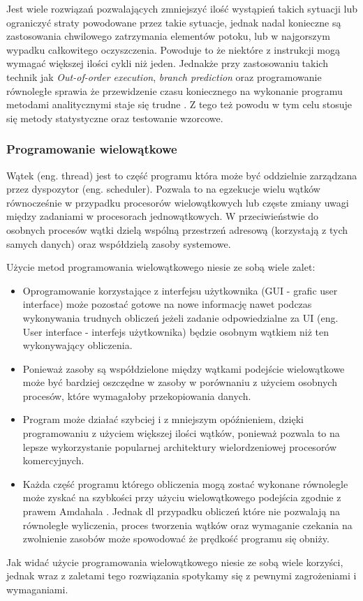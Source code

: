 \documentclass[a4paper,12pt]{article}
\begin{document}
Jest wiele rozwiązań pozwalających zmniejszyć ilość wystąpień takich sytuacji lub ograniczyć straty powodowane przez takie sytuacje, jednak nadal konieczne są zastosowania chwilowego zatrzymania elementów potoku, lub w najgorszym wypadku całkowitego oczyszczenia.
Powoduje to że niektóre z instrukcji mogą wymagać większej ilości cykli niż jeden. Jednakże przy zastosowaniu takich technik jak
\textit{Out-of-order execution}, \textit{branch prediction} oraz programowanie równoległe  sprawia że przewidzenie czasu koniecznego na wykonanie programu metodami analitycznymi staje się trudne . 
Z tego też powodu w tym celu stosuje się metody statystyczne oraz testowanie wzorcowe. 

\subsubsection{Programowanie wielowątkowe}

Wątek (eng. thread) jest to część programu która może być oddzielnie zarządzana przez dyspozytor (eng. scheduler). 
Pozwala to na egzekucje wielu wątków równocześnie w przypadku procesorów wielowątkowych lub częste zmiany uwagi między zadaniami w procesorach jednowątkowych.
W przeciwieństwie do osobnych procesów wątki dzielą wspólną przestrzeń adresową (korzystają z tych samych danych) oraz współdzielą zasoby systemowe.

Użycie metod programowania wielowątkowego niesie ze sobą wiele zalet:
\begin{itemize}
        \item Oprogramowanie korzystające z interfejsu użytkownika (GUI - grafic user interface) może pozostać gotowe na nowe informację nawet podczas wykonywania trudnych obliczeń jeżeli zadanie odpowiedzialne za UI (eng. User interface - interfejs użytkownika) będzie osobnym wątkiem niż ten wykonywający obliczenia.
        \item Ponieważ zasoby są współdzielone między wątkami podejście wielowątkowe może być bardziej oszczędne w zasoby w porównaniu z użyciem osobnych procesów, które wymagałoby przekopiowania danych.
        \item Program może działać szybciej i z mniejszym opóźnieniem, dzięki programowaniu z użyciem większej ilości wątków, ponieważ pozwala to na lepsze wykorzystanie popularnej architektury wielordzeniowej procesorów komercyjnych. 
        \item Każda część programu którego obliczenia mogą zostać wykonane równolegle może zyskać na szybkości przy użyciu wielowątkowego podejścia zgodnie z prawem Amdahala \cite{arch}. 
        Jednak dl przypadku obliczeń które nie pozwalają na równoległe wyliczenia, proces tworzenia wątków oraz wymaganie czekania na zwolnienie zasobów może spowodować że prędkość programu się obniży.
\end{itemize}
Jak widać użycie programowania wielowątkowego niesie ze sobą wiele korzyści,
jednak wraz z zaletami tego rozwiązania spotykamy się z pewnymi zagrożeniami i wymaganiami.
\end{document}
